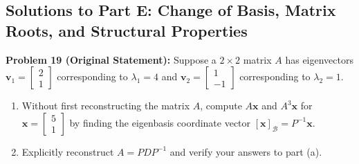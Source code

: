 \documentclass[11pt, letterpaper]{article}
\theoremstyle{definition}
\theoremstyle{remark}
\begin{document}
\subsection{Solutions to Part E: Change of Basis, Matrix Roots, and Structural Properties}

\textbf{Problem 19 (Original Statement):}
Suppose a $2 \times 2$ matrix $A$ has eigenvectors $\mathbf{v}_1 = \begin{bmatrix} 2 \\ 1 \end{bmatrix}$ corresponding to $\lambda_1 = 4$ and $\mathbf{v}_2 = \begin{bmatrix} 1 \\ -1 \end{bmatrix}$ corresponding to $\lambda_2 = 1$.
\begin{enumerate}[label=(\alph*)]
    \item Without first reconstructing the matrix $A$, compute $A\mathbf{x}$ and $A^{3}\mathbf{x}$ for $\mathbf{x} = \begin{bmatrix} 5 \\ 1 \end{bmatrix}$ by finding the eigenbasis coordinate vector $[\mathbf{x}]_{\mathcal{B}} = P^{-1}\mathbf{x}$.
    \item Explicitly reconstruct $A = PDP^{-1}$ and verify your answers to part (a).
\end{enumerate}
\end{document}

